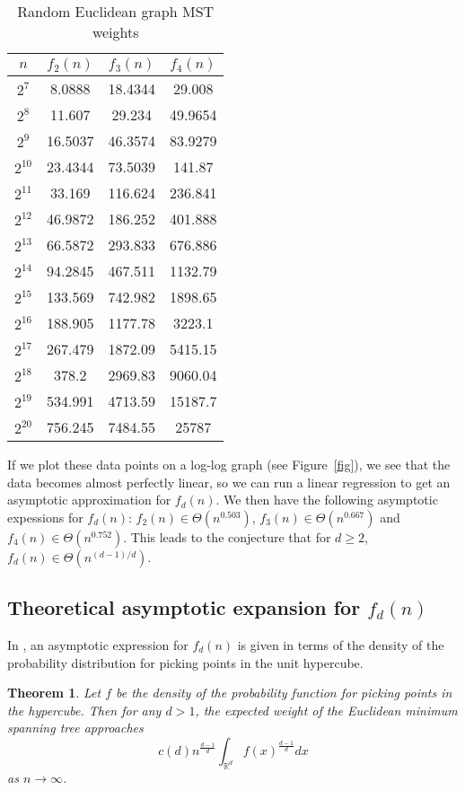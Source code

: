 \documentclass[a4paper, 10pt, twocolumn, twoside]{article}
\newtheorem{theorem}{Theorem}
\begin{document}
\renewcommand{\arraystretch}{1.5}
\begin{table}[htbp]
\centering
\caption{Random Euclidean graph MST weights}
\begin{tabular}{||c|c|c|c||}
\hline
$n$ & $f_2(n)$ & $f_3(n)$ & $f_4(n)$ \\
\hline
$2^{7}$& 8.0888&	18.4344&	29.008\\
$2^{8}$&11.607& 29.234& 49.9654\\
$2^{9}$&16.5037&	46.3574&	83.9279\\
$2^{10}$&23.4344&	73.5039&	141.87\\
$2^{11}$&33.169& 116.624& 236.841\\
$2^{12}$&46.9872&	186.252&	401.888\\
$2^{13}$&66.5872&	293.833&	676.886\\
$2^{14}$&94.2845&	467.511&	1132.79\\
$2^{15}$&133.569& 742.982&	1898.65\\
$2^{16}$&188.905&	1177.78&	3223.1\\
$2^{17}$&267.479&	1872.09&	5415.15\\
$2^{18}$&378.2& 2969.83& 9060.04\\
$2^{19}$&534.991&	4713.59&	15187.7\\
$2^{20}$&756.245&	7484.55&	25787\\
\hline
\end{tabular}
\end{table}

If we plot these data points on a log-log graph (see Figure~\ref{fig}), we see that the data becomes almost perfectly linear, so we can run a linear regression to get an asymptotic approximation for $f_d(n)$. We then have the following asymptotic expessions for $f_d(n)$: $f_2(n)\in\Theta(n^{0.503})$, $f_3(n)\in \Theta(n^{0.667})$ and $f_4(n)\in \Theta(n^{0.752})$. This leads to the conjecture that for $d\geq 2$, $f_d(n)\in \Theta(n^{(d-1)/d})$. 

\subsection{Theoretical asymptotic expansion for $f_d(n)$}
In \cite{St1988}, an asymptotic expression for $f_d(n)$ is given in terms of the density of the probability distribution for picking points in the unit hypercube.

\begin{theorem}
    Let $f$ be the density of the probability function for picking points in the hypercube. Then for any $d>1$, the expected weight of the Euclidean minimum spanning tree approaches 
    \[
        c(d)n^{\frac{d-1}{d}}\int_{\mathbb{R}^d}f(x)^{\frac{d-1}{d}}dx
    \] 
    as $n\to \infty$. 
\end{theorem}
\end{document}
